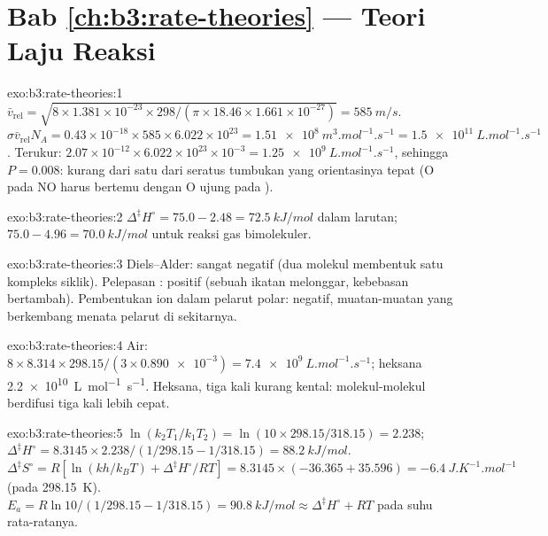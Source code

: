 \section*{Bab \ref{ch:b3:rate-theories} --- Teori Laju Reaksi}

\begin{solution}{exo:b3:rate-theories:1}
$\bar v_{\mathrm{rel}} = \sqrt{8 \times 1.381\times10^{-23} \times 298/(\pi \times 18.46 \times 1.661\times10^{-27})} = \qty{585}{m/s}$.
$\sigma\bar v_{\mathrm{rel}}N_A = 0.43\times10^{-18} \times 585 \times 6.022\times10^{23} = \qty{1.51e8}{m^3.mol^{-1}.s^{-1}} =
\qty{1.5e11}{L.mol^{-1}.s^{-1}}$. Terukur: $2.07\times10^{-12} \times 6.022\times10^{23}\times10^{-3} =
\qty{1.25e9}{L.mol^{-1}.s^{-1}}$, sehingga $P = 0.008$: kurang dari satu dari seratus
tumbukan yang orientasinya tepat (O pada NO harus bertemu dengan O ujung pada
).
\end{solution}

\begin{solution}{exo:b3:rate-theories:2}
$\Delta^{\ddagger}H^\circ = 75.0 - 2.48 = \qty{72.5}{kJ/mol}$ dalam larutan;
$75.0 - 4.96 = \qty{70.0}{kJ/mol}$ untuk reaksi gas bimolekuler.
\end{solution}

\begin{solution}{exo:b3:rate-theories:3}
Diels--Alder: sangat negatif (dua molekul membentuk satu kompleks siklik).
Pelepasan : positif (sebuah ikatan melonggar, kebebasan bertambah).
Pembentukan ion dalam pelarut polar: negatif, muatan-muatan yang berkembang
menata pelarut di sekitarnya.
\end{solution}

\begin{solution}{exo:b3:rate-theories:4}
Air: $8 \times 8.314 \times 298.15/(3 \times \num{0.890e-3}) = \qty{7.4e9}{L.mol^{-1}.s^{-1}}$;
heksana \qty{2.2e10}{L.mol^{-1}.s^{-1}}. Heksana, tiga kali kurang kental:
molekul-molekul berdifusi tiga kali lebih cepat.
\end{solution}

\begin{solution}{exo:b3:rate-theories:5}
$\ln(k_2T_1/k_1T_2) = \ln(10 \times 298.15/318.15) = 2.238$; $\Delta^{\ddagger}H^\circ = 8.3145 \times 2.238/(1/298.15 -
1/318.15) = \qty{88.2}{kJ/mol}$. $\Delta^{\ddagger}S^\circ = R[\ln(kh/k_BT) + \Delta^{\ddagger}H^\circ/RT] = 8.3145 \times
(-36.365 + 35.596) = \qty{-6.4}{J.K^{-1}.mol^{-1}}$ (pada \qty{298.15}{K}). $E_a = R\ln10/(1/298.15 - 1/318.15) =
\qty{90.8}{kJ/mol} \approx \Delta^{\ddagger}H^\circ + RT$ pada suhu rata-ratanya.
\end{solution}

